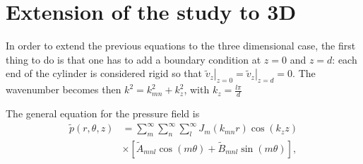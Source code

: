 \documentclass[%
 reprint,
 amsmath,amssymb,
 aps,
]{revtex4-2}
\begin{document}
\section{Extension of the study to 3D}
In order to extend the previous equations to the three dimensional case, the first thing to do is that one has to add a boundary condition at $z=0$ and $z=d$: each end of the cylinder is considered rigid so that $\left. \tilde{v}_z \right|_{z=0} = \left. \tilde{v}_z \right|_{z=d} = 0$. The wavenumber becomes then  $k^2 = k_{mn}^2 + k_z^2$, with $k_z = \frac{l \pi}{d}$

The general equation for the pressure field is
\begin{equation}
    \begin{split}
        \tilde{p}(r, \theta, z) &= \sum_m^{\infty}\sum_n^{\infty}\sum_l^{\infty} J_m(k_{mn}r) \cos(k_z z)\\ &\times \left[ \tilde{A}_{mnl} \cos(m \theta) + \tilde{B}_{mnl} \sin(m \theta) \right],
    \end{split}
\end{equation}
\end{document}

